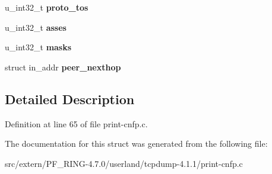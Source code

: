 \begin{DoxyCompactItemize}
\item 
\hypertarget{structnfrec_a8ff5980b76cc59790433e98e7de66b53}{
u\_\-int32\_\-t {\bfseries proto\_\-tos}}
\label{structnfrec_a8ff5980b76cc59790433e98e7de66b53}

\item 
\hypertarget{structnfrec_a0d4d8c9bd3daa4feaccc04894aabc08b}{
u\_\-int32\_\-t {\bfseries asses}}
\label{structnfrec_a0d4d8c9bd3daa4feaccc04894aabc08b}

\item 
\hypertarget{structnfrec_ac7ee29b24a61903c4f9921cd8684715a}{
u\_\-int32\_\-t {\bfseries masks}}
\label{structnfrec_ac7ee29b24a61903c4f9921cd8684715a}

\item 
\hypertarget{structnfrec_a57e30b2ea2d8ddbd600ca27bb61c8d55}{
struct in\_\-addr {\bfseries peer\_\-nexthop}}
\label{structnfrec_a57e30b2ea2d8ddbd600ca27bb61c8d55}

\end{DoxyCompactItemize}


\subsection{Detailed Description}


Definition at line 65 of file print-\/cnfp.c.



The documentation for this struct was generated from the following file:\begin{DoxyCompactItemize}
\item 
src/extern/PF\_\-RING-\/4.7.0/userland/tcpdump-\/4.1.1/print-\/cnfp.c\end{DoxyCompactItemize}
